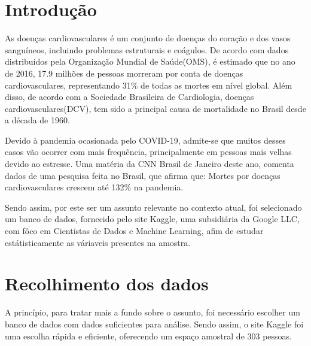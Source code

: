 \chapter*[Introdução]{Introdução}


    As doenças cardiovasculares é um conjunto de doenças do coração e dos vasos sanguíneos, incluindo 
    problemas estruturais e coágulos. De acordo com dados distribuídos pela Organização Mundial de Saúde(OMS), é estimado que no ano de 2016, 
    17.9 milhões de pessoas morreram por conta de doenças cardiovasculares, representando 31\% 
    de todas as mortes em nível global. Além disso, de acordo com a Sociedade Brasileira de Cardiologia, doenças cardiovasculares(DCV), tem sido a principal causa 
    de mortalidade no Brasil desde a década de 1960.

    Devido à pandemia ocasionada pelo COVID-19, admite-se que muitos desses casos vão ocorrer
    com mais frequência, principalmente em pessoas mais velhas devido ao estresse. Uma matéria da 
    CNN Brasil de Janeiro deste ano, comenta dados de uma pesquisa feita no Brasil, que afirma 
    que: Mortes por doenças cardiovasculares crescem até 132\% na pandemia.

    Sendo assim, por este ser um assunto relevante no contexto atual, foi selecionado um banco de 
    dados, fornecido pelo site Kaggle, uma subsidiária da Google LLC, com fôco em Cientistas 
    de Dados e Machine Learning, afim de estudar estátisticamente as váriaveis presentes na amostra.

    \newpage
    \chapter{Recolhimento dos dados}

    A princípio, para tratar mais a fundo sobre o assunto, foi necessário escolher um banco 
    de dados com dados suficientes para análise. Sendo assim, o site Kaggle foi uma escolha
    rápida e eficiente, oferecendo um espaço amostral de 303 pessoas. 

    \nocite{bancodedados}
    \nocite{oms}

    \newpage